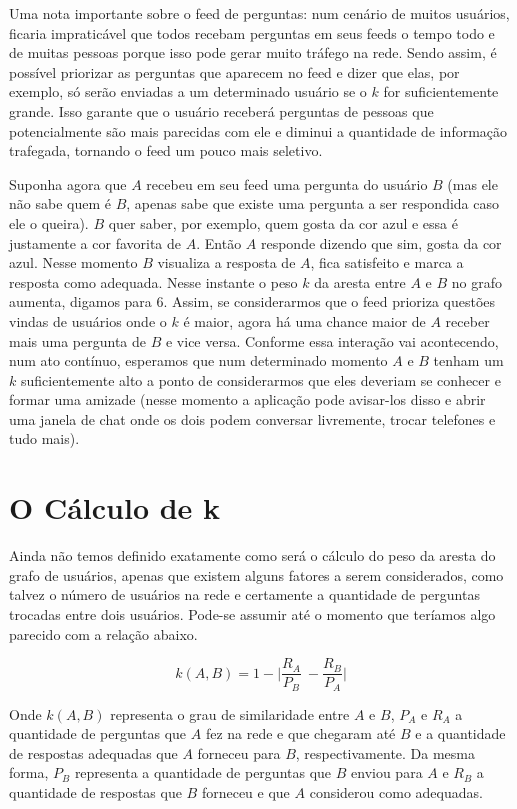 \documentclass[a4paper, 11pt]{article} %
\begin{document}
Uma nota importante sobre o feed de perguntas: num cenário de muitos usuários, ficaria impraticável que todos recebam perguntas em seus feeds o tempo todo e de muitas pessoas porque isso pode gerar muito tráfego na rede. Sendo assim, é possível priorizar as perguntas que aparecem no feed e dizer que elas, por exemplo, só serão enviadas a um determinado usuário se o $k$ for suficientemente grande. Isso garante que o usuário receberá perguntas de pessoas que potencialmente são mais parecidas com ele e diminui a quantidade de informação trafegada, tornando o feed um pouco mais seletivo.

Suponha agora que $A$ recebeu em seu feed uma pergunta do usuário $B$ (mas ele não sabe quem é $B$, apenas sabe que existe uma pergunta a ser respondida caso ele o queira). $B$ quer saber, por exemplo, quem gosta da cor azul e essa é justamente a cor favorita de $A$. Então $A$ responde dizendo que sim, gosta da cor azul. Nesse momento $B$ visualiza a resposta de $A$, fica satisfeito e marca a resposta como adequada. Nesse instante o peso $k$ da aresta entre $A$ e $B$ no grafo aumenta, digamos para 6. Assim, se considerarmos que o feed prioriza questões vindas de usuários onde o $k$ é maior, agora há uma chance maior de $A$ receber mais uma pergunta de $B$ e vice versa. Conforme essa interação vai acontecendo, num ato contínuo, esperamos que num determinado momento $A$ e $B$ tenham um $k$ suficientemente alto a ponto de considerarmos que eles deveriam se conhecer e formar uma amizade (nesse momento a aplicação pode avisar-los disso e abrir uma janela de chat onde os dois podem conversar livremente, trocar telefones e tudo mais).


\section*{O Cálculo de k}

Ainda não temos definido exatamente como será o cálculo do peso da aresta do grafo de usuários, apenas que existem alguns fatores a serem considerados, como talvez o número de usuários na rede e certamente a quantidade de perguntas trocadas entre dois usuários. Pode-se assumir até o momento que teríamos algo parecido com a relação abaixo.

\[ k(A,B) = 1 - \bigg|\frac{R_A}{P_B}\ - \frac{R_B}{P_A}\bigg|\]

Onde $k(A,B)$ representa o grau de similaridade entre $A$ e $B$, $P_A$ e $R_A$ a quantidade de perguntas que $A$ fez na rede e que chegaram até $B$ e a quantidade de respostas adequadas que $A$ forneceu para $B$, respectivamente. Da mesma forma, $P_B$ representa a quantidade de perguntas que $B$ enviou para $A$ e $R_B$ a quantidade de respostas que $B$ forneceu e que $A$ considerou como adequadas.
\end{document}
